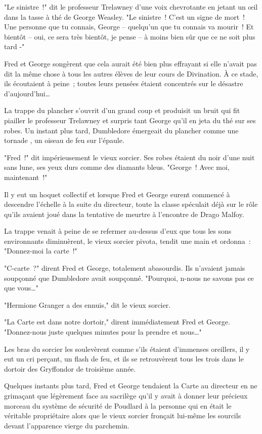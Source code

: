"Le sinistre~!" dit le professeur Trelawney d'une voix chevrotante en jetant un œil dans la tasse à thé de George Weasley. "Le sinistre~! C'est un signe de mort~! Une personne que tu connais, George -- quelqu'un que tu connais va mourir~! Et bientôt -- oui, ce sera très bientôt, je pense -- à moins bien sûr que ce ne soit plus tard -"

Fred et George songèrent que cela aurait été bien plus effrayant si elle n'avait pas dit la même chose à tous les autres élèves de leur cours de Divination. À ce stade, ils écoutaient à peine~; toutes leurs pensées étaient concentrés sur le désastre d'aujourd'hui…

La trappe du plancher s'ouvrit d'un grand coup et produisit un bruit qui fit piailler le professeur Trelawney et surpris tant George qu'il en jeta du thé sur ses robes. Un instant plus tard, Dumbledore émergeait du plancher comme une tornade , un oiseau de feu sur l'épaule.

"Fred~!" dit impérieusement le vieux sorcier. Ses robes étaient du noir d'une nuit sans lune, ses yeux durs comme des diamants bleus. "George~! Avec moi, maintenant~!"

Il y eut un hoquet collectif et lorsque Fred et George eurent commencé à descendre l'échelle à la suite du directeur, toute la classe spéculait déjà sur le rôle qu'ils avaient joué dans la tentative de meurtre à l'encontre de Drago Malfoy.

La trappe venait à peine de se refermer au-dessus d'eux que tous les sons environnants diminuèrent, le vieux sorcier pivota, tendit une main et ordonna~: "Donnez-moi la carte~!"

"C-carte~?" dirent Fred et George, totalement abasourdis. Ils n'avaient jamais soupçonné que Dumbledore avait soupçonné. "Pourquoi, n-nous ne savons pas ce que vous…"

"Hermione Granger a des ennuis," dit le vieux sorcier.

"La Carte est dans notre dortoir," dirent immédiatement Fred et George. "Donnez-nous juste quelques minutes pour la prendre et nous…"

Les bras du sorcier les soulevèrent comme s'ils étaient d'immenses oreillers, il y eut un cri perçant, un flash de feu, et ils se retrouvèrent tous les trois dans le dortoir des Gryffondor de troisième année.

Quelques instants plus tard, Fred et George tendaient la Carte au directeur en ne grimaçant que légèrement face au sacrilège qu'il y avait à donner leur précieux morceau du système de sécurité de Poudlard à la personne qui en était le véritable propriétaire alors que le vieux sorcier fronçait lui-même les sourcils devant l'apparence vierge du parchemin.


